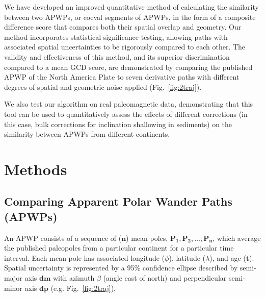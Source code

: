 We have developed an improved quantitative method of calculating the similarity
between two APWPs, or coeval segments of APWPs, in the form of a composite
difference score that compares both their spatial overlap and geometry. Our
method incorporates statistical significance testing, allowing paths with
associated spatial uncertainties to be rigorously compared to each other. The
validity and effectiveness of this method, and its superior discrimination
compared to a mean GCD score, are demonstrated by comparing the published APWP
of the North America Plate to seven derivative paths with different degrees of
spatial and geometric noise applied (Fig.~\ref{fig:2traj}).

We also test our algorithm on real paleomagnetic data, demonstrating that this
tool can be used to quantitatively assess the effects of different corrections
(in this case, bulk corrections for inclination shallowing in sediments) on the
similarity between APWPs from different continents.

\section{Methods}

\subsection{Comparing Apparent Polar Wander Paths (APWPs)}

An APWP consists of a sequence of ($\mathbf{n}$) mean poles,
$\mathbf{P_1,P_2,\ldots,P_n}$, which average the published paleopoles from a
particular continent for a particular time interval. Each mean pole has
associated longitude ($\phi$), latitude ($\lambda$), and age ($\mathbf{t}$).
Spatial uncertainty is represented by a 95\% confidence ellipse described by
semi-major axis $\mathbf{dm}$ with azimuth $\beta$ (angle east of north) and
perpendicular semi-minor axis $\mathbf{dp}$ (e.g. Fig.~\ref{fig:2traj}).

